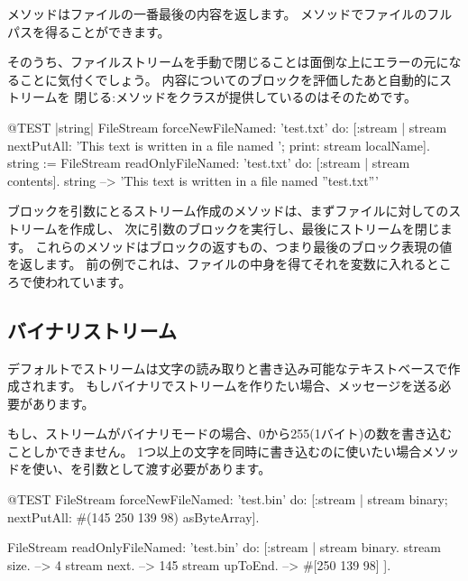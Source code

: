 \documentclass[a4paper,10pt,twoside]{book}
\begin{document}
メソッドはファイルの一番最後の内容を返します。
メソッドでファイルのフルパスを得ることができます。


そのうち、ファイルストリームを手動で閉じることは面倒な上にエラーの元になることに気付くでしょう。
内容についてのブロックを評価したあと自動的にストリームを
閉じる:メソッドをクラスが提供しているのはそのためです。


\begin{code}{@TEST |string|}
FileStream
    forceNewFileNamed: 'test.txt'
    do: [:stream |
        stream
            nextPutAll: 'This text is written in a file named ';
            print: stream localName].
string := FileStream
            readOnlyFileNamed: 'test.txt'
            do: [:stream | stream contents].
string --> 'This text is written in a file named ''test.txt'''
\end{code}

ブロックを引数にとるストリーム作成のメソッドは、まずファイルに対してのストリームを作成し、
次に引数のブロックを実行し、最後にストリームを閉じます。
これらのメソッドはブロックの返すもの、つまり最後のブロック表現の値を返します。
前の例でこれは、ファイルの中身を得てそれを変数に入れるところで使われています。

\subsection{バイナリストリーム}


デフォルトでストリームは文字の読み取りと書き込み可能なテキストベースで作成されます。
もしバイナリでストリームを作りたい場合、メッセージを送る必要があります。


もし、ストリームがバイナリモードの場合、0から255(1バイト)の数を書き込むことしかできません。
1つ以上の文字を同時に書き込むのに使いたい場合メソッドを使い、を引数として渡す必要があります。

\begin{code}{@TEST}
FileStream
  forceNewFileNamed: 'test.bin'
  do: [:stream |
          stream
            binary;
            nextPutAll: #(145 250 139 98) asByteArray].

FileStream
  readOnlyFileNamed: 'test.bin'
  do: [:stream |
          stream binary.
          stream size.         --> 4
          stream next.         --> 145
          stream upToEnd. --> #[250 139 98]
      ].
\end{code}
\end{document}
